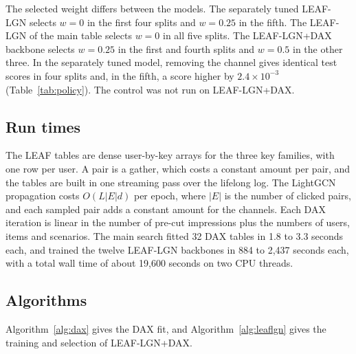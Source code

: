 The selected weight differs between the models. The separately tuned LEAF-LGN selects $w=0$ in the first four splits and $w=0.25$ in the fifth. The
LEAF-LGN of the main table selects $w=0$ in all five splits. The LEAF-LGN+DAX backbone selects $w=0.25$ in the first and fourth splits and $w=0.5$
in the other three. In the separately tuned model, removing the channel gives identical test scores in four splits and, in the fifth, a score higher by
$2.4\times10^{-3}$ (Table~\ref{tab:policy}). The control was not run on LEAF-LGN+DAX.



\subsection{Run times}\label{app:cost}

The LEAF tables are dense user-by-key arrays for the three key families, with one row per user. A pair is a gather, which costs a constant amount per
pair, and the tables are built in one streaming pass over the lifelong log. The LightGCN propagation costs $O(L|E|d)$ per epoch, where $|E|$ is the number
of clicked pairs, and each sampled pair adds a constant amount for the channels. Each DAX iteration is linear in the number of pre-cut impressions plus
the numbers of users, items and scenarios. The main search fitted 32 DAX tables in 1.8 to 3.3 seconds each, and trained the twelve LEAF-LGN backbones in 884
to 2,437 seconds each, with a total wall time of about 19,600 seconds on two CPU threads.

\subsection{Algorithms}
\label{sec:method-algorithms}

Algorithm~\ref{alg:dax} gives the DAX fit, and Algorithm~\ref{alg:leaflgn} gives the training and selection of LEAF-LGN+DAX.


